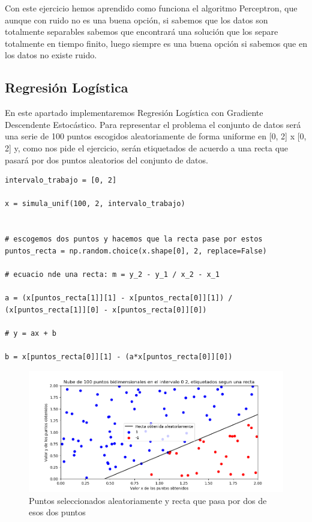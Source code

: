 \documentclass[12pt, spanish]{article}
\begin{document}
Con este ejercicio hemos aprendido como funciona el algoritmo Perceptron, que aunque con ruido no es una buena opción, si sabemos que los datos son totalmente separables sabemos que encontrará una solución que los separe totalmente en tiempo finito, luego siempre es una buena opción si sabemos que en los datos no existe ruido.


\newpage

\subsection{Regresión Logística}

En este apartado implementaremos Regresión Logística con Gradiente Descendente Estocástico. Para representar el problema el conjunto de datos será una serie de 100 puntos escogidos aleatoriamente de forma uniforme en [0, 2] x [0, 2] y, como nos pide el ejercicio, serán etiquetados de acuerdo a una recta que pasará por dos puntos aleatorios del conjunto de datos.

\begin{lstlisting}
intervalo_trabajo = [0, 2]

x = simula_unif(100, 2, intervalo_trabajo)


# escogemos dos puntos y hacemos que la recta pase por estos
puntos_recta = np.random.choice(x.shape[0], 2, replace=False)

# ecuacio nde una recta: m = y_2 - y_1 / x_2 - x_1

a = (x[puntos_recta[1]][1] - x[puntos_recta[0]][1]) / (x[puntos_recta[1]][0] - x[puntos_recta[0]][0])

# y = ax + b

b = x[puntos_recta[0]][1] - (a*x[puntos_recta[0]][0])
\end{lstlisting}

\begin{figure}[H]
  \centering
      \includegraphics[scale = 0.70]{ej-2-puntos.png}
 		 \caption{Puntos seleccionados aleatoriamente y recta que pasa por dos de esos dos puntos}
  		\label{fig:ej2-puntos}

\end{figure}
\end{document}
